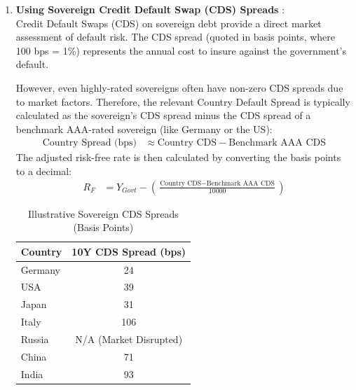 \begin{enumerate}
    \item \textbf{Using Sovereign Credit Default Swap (CDS) Spreads} \label{sec:cds_spreads}:\\
          Credit Default Swaps (CDS) on sovereign debt provide a direct market assessment of default risk. The CDS spread (quoted in basis points, where 100 bps = 1\%) represents the annual cost to insure against the government's default.

          However, even highly-rated sovereigns often have non-zero CDS spreads due to market factors. Therefore, the relevant Country Default Spread is typically calculated as the sovereign's CDS spread minus the CDS spread of a benchmark AAA-rated sovereign (like Germany or the US):
          \begin{align*}
              \text{Country Spread (bps)} & \approx \text{Country CDS} - \text{Benchmark AAA CDS}
          \end{align*}
          The adjusted risk-free rate is then calculated by converting the basis points to a decimal:
          \begin{align*}
              R_F & = Y_{Govt} - \left( \frac{\text{Country CDS} - \text{Benchmark AAA CDS}}{10000} \right)
          \end{align*}

          \begin{table}[H]
              \centering
              \caption{Illustrative Sovereign CDS Spreads (Basis Points)}
              \label{tab:cds_country_prices_example}
              \vspace{2mm}
              \begin{tabular}{|l|c|}
                  \hline
                  \textbf{Country} & \textbf{10Y CDS Spread (bps)} \\ \hline
                  Germany          & 24                            \\ \hline
                  USA              & 39                            \\ \hline
                  Japan            & 31                            \\ \hline
                  Italy            & 106                           \\ \hline
                  Russia           & N/A (Market Disrupted)        \\ \hline
                  China            & 71                            \\ \hline
                  India            & 93                            \\ \hline
              \end{tabular}


\end{table}
\end{enumerate}
